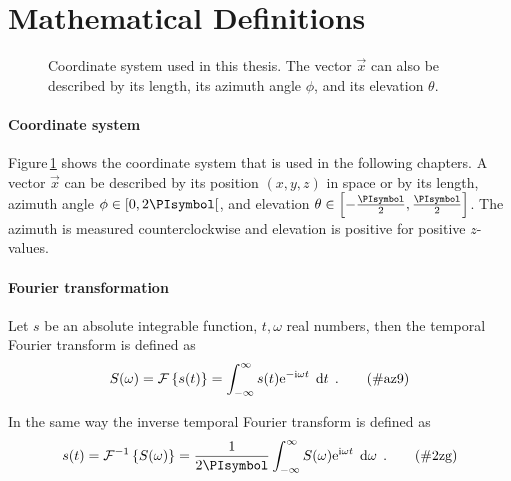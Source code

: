 \section{Mathematical Definitions}
\label{sec:mathematical_definitions}
%
\begin{figure}
    \centering
    \small
    
    \caption{Coordinate system used in this thesis. The vector $\vec{x}$ can also
    be described by its length, its azimuth angle $\phi$, and its elevation
    $\theta$.
    }
    \label{fig:coordinate_system}
\end{figure}
%
\paragraph{Coordinate system}
Figure\,\ref{fig:coordinate_system} shows the coordinate system that is used in
the following chapters. A vector $\vec{x}$ can be described by its position
$(x,y,z)$ in space or by its length, azimuth angle $\phi \in [0,2\PI[$,
and elevation $\theta \in \left[-\frac{\PI}{2},\frac{\PI}{2}\right]$.
The azimuth is measured counterclockwise and elevation is positive
for positive $z$-values.


\paragraph{Fourier transformation}
Let $s$ be an absolute integrable function, $t,\omega$ real numbers, then the
temporal Fourier transform is defined as\autocite{Bracewell2000}
%
\begin{equation}
    S(\omega) = \FT{s(t)} = \int^{\infty}_{-\infty} s(t) \E^{-\I\omega t}
    \; \D{t}
    \qp
    \tag{\#az9}
    \label{eq:ft}
\end{equation}

In the same way the inverse temporal Fourier transform is defined as
%
\begin{equation}
    s(t) = \IFT{S(\omega)} = \frac{1}{2\PI} \int^{\infty}_{-\infty} S(\omega)
    \E^{\I\omega t} \; \D\omega
    \qp
    \tag{\#2zg}
    \label{eq:ift}
\end{equation}
